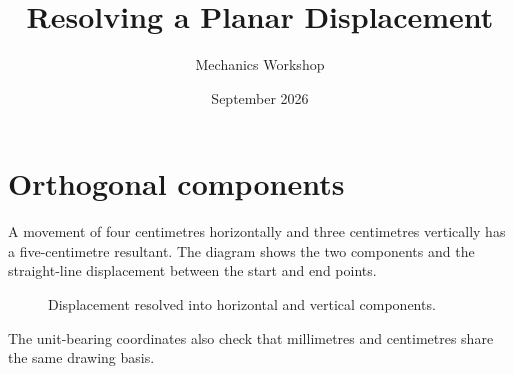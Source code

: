 \documentclass{article}
\title{Resolving a Planar Displacement}
\author{Mechanics Workshop}
\date{September 2026}
\begin{document}
\maketitle

\section{Orthogonal components}
A movement of four centimetres horizontally and three centimetres vertically
has a five-centimetre resultant. The diagram shows the two components and
the straight-line displacement between the start and end points.

\begin{figure}
\centering
{}
\caption{Displacement resolved into horizontal and vertical components.}
\label{fig:displacement}
\end{figure}

The unit-bearing coordinates also check that millimetres and centimetres
share the same drawing basis.
\end{document}
